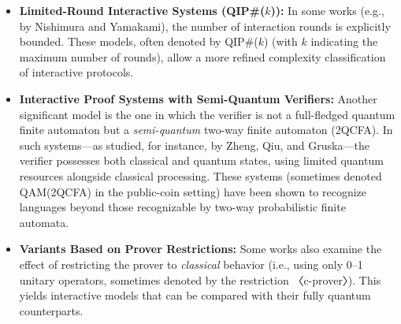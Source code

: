 \begin{itemize}
  \item \textbf{Limited-Round Interactive Systems (QIP\#($k$)):} In some works (e.g., by Nishimura and Yamakami), the number of interaction rounds is explicitly bounded. These models, often denoted by QIP\#($k$) (with $k$ indicating the maximum number of rounds), allow a more refined complexity classification of interactive protocols.
  
  \item \textbf{Interactive Proof Systems with Semi-Quantum Verifiers:} Another significant model is the one in which the verifier is not a full-fledged quantum finite automaton but a \emph{semi-quantum} two-way finite automaton (2QCFA). In such systems—as studied, for instance, by Zheng, Qiu, and Gruska—the verifier possesses both classical and quantum states, using limited quantum resources alongside classical processing. These systems (sometimes denoted QAM(2QCFA) in the public-coin setting) have been shown to recognize languages beyond those recognizable by two-way probabilistic finite automata.
  
  \item \textbf{Variants Based on Prover Restrictions:} Some works also examine the effect of restricting the prover to \emph{classical} behavior (i.e., using only 0–1 unitary operators, sometimes denoted by the restriction 〈c-prover〉). This yields interactive models that can be compared with their fully quantum counterparts.
\end{itemize}